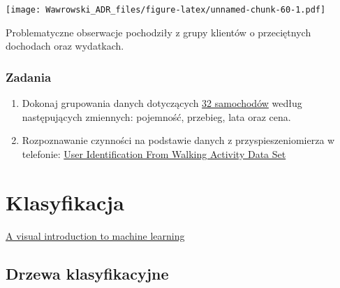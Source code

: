 \documentclass[]{book}
\newenvironment{Shaded}{\begin{snugshade}}{\end{snugshade}}
\newcommand{\DataTypeTok}[1]{\textcolor[rgb]{0.13,0.29,0.53}{#1}}
\newcommand{\KeywordTok}[1]{\textcolor[rgb]{0.13,0.29,0.53}{\textbf{#1}}}
\newcommand{\NormalTok}[1]{#1}
\newcommand{\OperatorTok}[1]{\textcolor[rgb]{0.81,0.36,0.00}{\textbf{#1}}}
\newcommand{\StringTok}[1]{\textcolor[rgb]{0.31,0.60,0.02}{#1}}
\begin{document}
\begin{Shaded}
\end{Shaded}

\texttt{[image: Wawrowski\_ADR\_files/figure-latex/unnamed-chunk-60-1.pdf]}

Problematyczne obserwacje pochodziły z grupy klientów o przeciętnych dochodach oraz wydatkach.

\hypertarget{zadania}{%
\subsection{Zadania}\label{zadania}}

\begin{enumerate}
\def\labelenumi{\arabic{enumi}.}
\item
  Dokonaj grupowania danych dotyczących \href{data/auta.csv}{32 samochodów} według następujących zmiennych: pojemność, przebieg, lata oraz cena.
\item
  Rozpoznawanie czynności na podstawie danych z przyspieszeniomierza w telefonie: \href{http://archive.ics.uci.edu/ml/datasets/User+Identification+From+Walking+Activity\#}{User Identification From Walking Activity Data Set}
\end{enumerate}

\hypertarget{klasyfikacja}{%
\chapter{Klasyfikacja}\label{klasyfikacja}}

\href{http://www.r2d3.us/visual-intro-to-machine-learning-part-1/}{A visual introduction to machine learning}

\hypertarget{drzewa-klasyfikacyjne}{%
\section{Drzewa klasyfikacyjne}\label{drzewa-klasyfikacyjne}}
\end{document}
